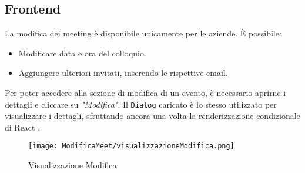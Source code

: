 \subsection{Frontend}
La modifica dei meeting è disponibile unicamente per le aziende. È possibile:
\begin{itemize}
    \item Modificare data e ora del colloquio.
    \item Aggiungere ulteriori invitati, inserendo le rispettive email.
\end{itemize}
Per poter accedere alla sezione di modifica di un evento, è necessario aprirne i dettagli e cliccare su \textit{"Modifica"}. 
Il \texttt{Dialog} caricato è lo stesso utilizzato per visualizzare i dettagli, sfruttando ancora una volta la renderizzazione
condizionale di React . \cite{reactConditionalRendering}
\begin{figure}[H]   
    \centering
    \texttt{[image: ModificaMeet/visualizzazioneModifica.png]}
    \caption{Visualizzazione Modifica}
\end{figure}
